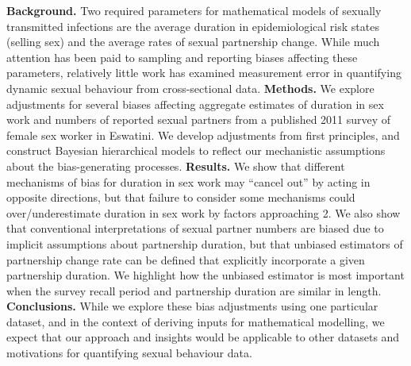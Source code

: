\textbf{Background.}
Two required parameters for mathematical models of sexually transmitted infections are
the average duration in epidemiological risk states (\eg selling sex) and
the average rates of sexual partnership change.
While much attention has been paid to
sampling and reporting biases affecting these parameters,
relatively little work has examined measurement error
in quantifying dynamic sexual behaviour from cross-sectional data.
\textbf{Methods.}
We explore adjustments for several biases affecting aggregate estimates of
duration in sex work and numbers of reported sexual partners
from a published 2011 survey of female sex worker in Eswatini.
We develop adjustments from first principles,
and construct Bayesian hierarchical models to reflect
our mechanistic assumptions about the bias-generating processes.
\textbf{Results.}
We show that different mechanisms of bias for duration in sex work may
``cancel out'' by acting in opposite directions,
but that failure to consider some mechanisms could over/underestimate
duration in sex work by factors approaching 2.
We also show that conventional interpretations of sexual partner numbers
are biased due to implicit assumptions about partnership duration,
but that unbiased estimators of partnership change rate can be defined
that explicitly incorporate a given partnership duration.
We highlight how the unbiased estimator is most important when
the survey recall period and partnership duration are similar in length.
\textbf{Conclusions.}
While we explore these bias adjustments using one particular dataset,
and in the context of deriving inputs for mathematical modelling,
we expect that our approach and insights would be applicable to
other datasets and motivations for quantifying sexual behaviour data.
